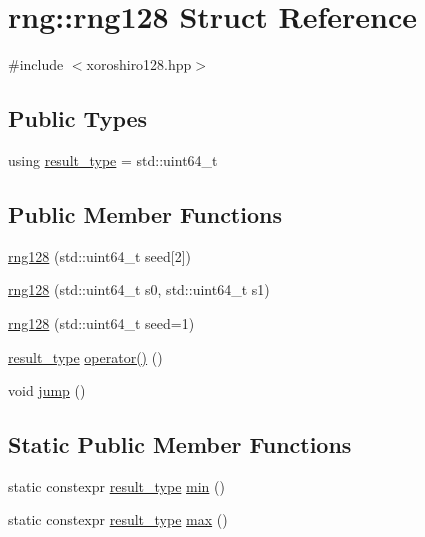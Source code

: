 \hypertarget{structrng_1_1rng128}{}\section{rng\+:\+:rng128 Struct Reference}
\label{structrng_1_1rng128}


{\ttfamily \#include $<$xoroshiro128.\+hpp$>$}

\subsection*{Public Types}
\begin{DoxyCompactItemize}
\item 
using \hyperlink{structrng_1_1rng128_ab7d42d935d81aad9a6cbd2140c27c450}{result\+\_\+type} = std\+::uint64\+\_\+t
\end{DoxyCompactItemize}
\subsection*{Public Member Functions}
\begin{DoxyCompactItemize}
\item 
\hyperlink{structrng_1_1rng128_a075a40ace82e1b3cc86cb31c7d140d6a}{rng128} (std\+::uint64\+\_\+t seed\mbox{[}2\mbox{]})
\item 
\hyperlink{structrng_1_1rng128_a55d94c481d5868b0abf03642f418d41d}{rng128} (std\+::uint64\+\_\+t s0, std\+::uint64\+\_\+t s1)
\item 
\hyperlink{structrng_1_1rng128_a8ae5a0f4601644db6f53534dab212852}{rng128} (std\+::uint64\+\_\+t seed=1)
\item 
\hyperlink{structrng_1_1rng128_ab7d42d935d81aad9a6cbd2140c27c450}{result\+\_\+type} \hyperlink{structrng_1_1rng128_aa21c14d5e49dbfdd866d988a921afa0b}{operator()} ()
\item 
void \hyperlink{structrng_1_1rng128_a4fadbbb54e7c39ba18ea33a857c8d562}{jump} ()
\end{DoxyCompactItemize}
\subsection*{Static Public Member Functions}
\begin{DoxyCompactItemize}
\item 
static constexpr \hyperlink{structrng_1_1rng128_ab7d42d935d81aad9a6cbd2140c27c450}{result\+\_\+type} \hyperlink{structrng_1_1rng128_a20c0a511a7874b8046ae9fcae1886abd}{min} ()
\item 
static constexpr \hyperlink{structrng_1_1rng128_ab7d42d935d81aad9a6cbd2140c27c450}{result\+\_\+type} \hyperlink{structrng_1_1rng128_a3889fe58babe382eb1d51fc70b761e56}{max} ()
\end{DoxyCompactItemize}
